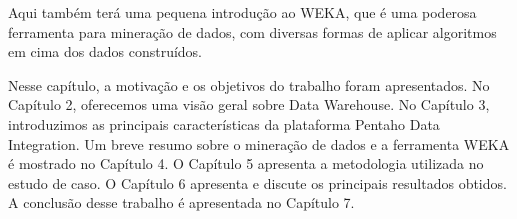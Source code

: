 Aqui também terá uma pequena introdução ao WEKA, que é uma poderosa ferramenta para mineração de dados, com diversas formas de aplicar algoritmos em cima dos dados construídos.

Nesse capítulo, a motivação e os objetivos do trabalho foram apresentados. No Capítulo 2, oferecemos uma visão geral sobre Data Warehouse. No Capítulo 3, introduzimos as principais características da plataforma Pentaho Data Integration. Um breve resumo sobre o mineração de dados e a ferramenta WEKA é mostrado no Capítulo 4. O Capítulo 5 apresenta a metodologia utilizada no estudo de caso. O Capítulo 6 apresenta e discute os principais resultados obtidos. A conclusão desse trabalho é apresentada no Capítulo 7.